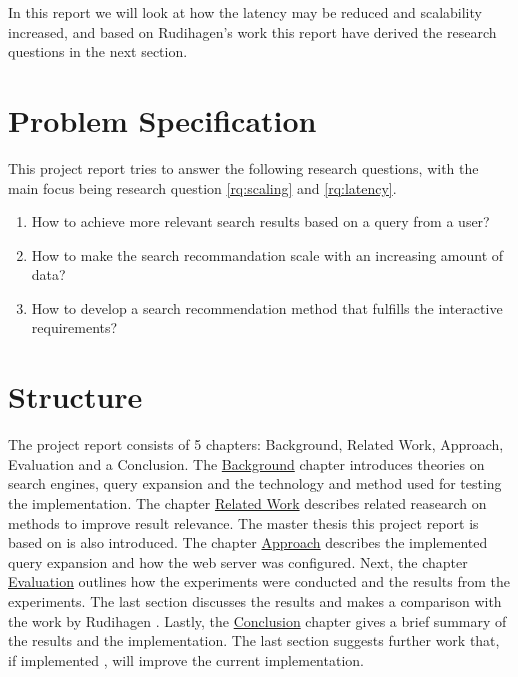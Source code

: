 In this report we will look at how the latency may be reduced and scalability increased,
and based on Rudihagen's work this report have derived the research questions in the next section.

\section{Problem Specification}
\label{sec:problem-specification}
This project report tries to answer the following research questions, with the main focus being research question \ref{rq:scaling} and \ref{rq:latency}.

\begin{enumerate}
  \item How to achieve more relevant search results based on a query from a user?
  \item\label{rq:scaling} How to make the search recommandation scale with an increasing amount of data?
  \item\label{rq:latency} How to develop a search recommendation method that fulfills the interactive requirements?
\end{enumerate}

\section{Structure}
The project report consists of 5 chapters: Background, Related Work, Approach, Evaluation and a Conclusion.
The \hyperref[ch:background]{Background} chapter introduces theories on search engines,
query expansion and the technology and method used for testing the implementation.
The chapter \hyperref[ch:related-work]{Related Work} describes related reasearch on methods to improve result relevance.
The master thesis this project report is based on is also introduced.
The chapter \hyperref[ch:approach]{Approach} describes the implemented query expansion and how the web server was configured.
Next, the chapter \hyperref[ch:evaluation]{Evaluation} outlines how the experiments were conducted and the results from the experiments.
The last section discusses the results and makes a comparison with the work by Rudihagen \cite{master-thesis}.
Lastly, the \hyperref[ch:conclusion]{Conclusion} chapter gives a brief summary of the results and the implementation.
The last section suggests further work that, if implemented , will improve the current implementation.

